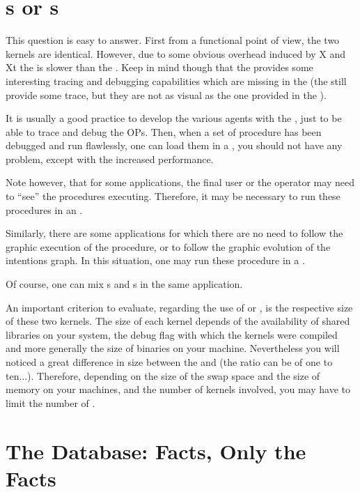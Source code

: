 \section{\CPK{}s or \XPK{}s}

This question is easy to answer. First from a functional point of view, the
two kernels are identical. However, due to some obvious overhead induced by
X and Xt the \XPK{} is slower than the \CPK{}. Keep in mind though that the
\XPK{} provides some interesting tracing and debugging capabilities which
are missing in the \CPK{} (the \CPK{} still provide some trace, but they
are not as visual as the one provided in the \XPK{}).

It is usually a good practice to develop the various \COPRS{} agents with
the \XPK{}, just to be able to trace and debug the OPs. Then, when a set
of procedure has been debugged and run flawlessly, one can load them in a
\CPK{}, you should not have any problem, except with the increased
performance.

Note however, that for some applications, the final user or the operator
may need to ``see'' the procedures executing. Therefore, it may be
necessary to run these procedures in an \XPK{}.

Similarly, there are some applications for which there are no need to
follow the graphic execution of the procedure, or to follow the graphic
evolution of the intentions graph. In this situation, one may run these
procedure in a \CPK{}.

Of course, one can mix \XPK{}s and \CPK{}s in the same application.

An important criterion to evaluate, regarding the use of \CPK{} or \XPK{},
is the respective size of these two kernels. The size of each kernel
depends of the availability of shared libraries on your system, the debug
flag with which the kernels were compiled and more generally the size of
binaries on your machine. Nevertheless you will noticed a
great difference in size between the \XPK{} and \CPK{} (the ratio can be of
one to ten...). Therefore, depending on the size of the swap space and the
size of memory on your machines, and the number of kernels involved, you
may have to limit the number of \XPK{}.

\section{The Database: Facts, Only the Facts}

